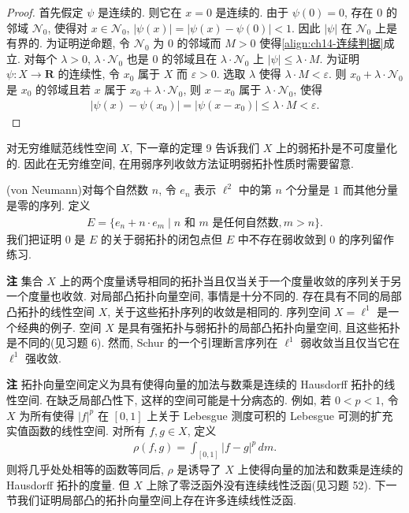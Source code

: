 \documentclass[../../main.tex]{subfiles}
\begin{document}
\begin{proof}
首先假定 $\psi$ 是连续的. 则它在 $x=0$ 是连续的. 由于 $\psi(0)=0$, 存在 $0$ 的邻域 $\mathcal{N}_{0}$, 使得对 $x\in\mathcal{N}_{0}$, $|\psi(x)|=|\psi(x)-\psi(0)|<1$. 因此 $|\psi|$ 在 $\mathcal{N}_{0}$ 上是有界的. 为证明逆命题, 令 $\mathcal{N}_{0}$ 为 $0$ 的邻域而 $M>0$ 使得\eqref{align:ch14-连续判据}成立. 对每个 $\lambda>0$, $\lambda\cdot\mathcal{N}_{0}$ 也是 $0$ 的邻域且在 $\lambda\cdot\mathcal{N}_{0}$ 上 $|\psi|\leqslant\lambda\cdot M$. 为证明 $\psi:X\to\mathbf{R}$ 的连续性, 令 $x_{0}$ 属于 $X$ 而 $\varepsilon>0$. 选取 $\lambda$ 使得 $\lambda\cdot M<\varepsilon$. 则 $x_{0}+\lambda\cdot\mathcal{N}_{0}$ 是 $x_{0}$ 的邻域且若 $x$ 属于 $x_{0}+\lambda\cdot\mathcal{N}_{0}$, 则 $x-x_{0}$ 属于 $\lambda\cdot\mathcal{N}_{0}$, 使得
\begin{align*}
|\psi(x)-\psi(x_{0})|=|\psi(x-x_{0})|\leqslant\lambda\cdot M<\varepsilon.
\end{align*}
\end{proof}

对无穷维赋范线性空间 $X$, 下一章的定理 9 告诉我们 $X$ 上的弱拓扑是不可度量化的. 因此在无穷维空间, 在用弱序列收敛方法证明弱拓扑性质时需要留意.

\begin{example}\label{example:ch14-vonNeumann}
(von Neumann)对每个自然数 $n$, 令 $e_{n}$ 表示 $\ell^{2}$ 中的第 $n$ 个分量是 $1$ 而其他分量是零的序列. 定义
\begin{align*}
E=\{e_{n}+n\cdot e_{m}\mid n\text{ 和 }m\text{ 是任何自然数},m>n\}.
\end{align*}
我们把证明 $0$ 是 $E$ 的关于弱拓扑的闭包点但 $E$ 中不存在弱收敛到 $0$ 的序列留作练习.
\end{example}

\textbf{注} 集合 $X$ 上的两个度量诱导相同的拓扑当且仅当关于一个度量收敛的序列关于另一个度量也收敛. 对局部凸拓扑向量空间, 事情是十分不同的. 存在具有不同的局部凸拓扑的线性空间 $X$, 关于这些拓扑序列的收敛是相同的. 序列空间 $X=\ell^{1}$ 是一个经典的例子. 空间 $X$ 是具有强拓扑与弱拓扑的局部凸拓扑向量空间, 且这些拓扑是不同的(见习题 6). 然而, Schur 的一个引理断言序列在 $\ell^{1}$ 弱收敛当且仅当它在 $\ell^{1}$ 强收敛.

\textbf{注} 拓扑向量空间定义为具有使得向量的加法与数乘是连续的 Hausdorff 拓扑的线性空间. 在缺乏局部凸性下, 这样的空间可能是十分病态的. 例如, 若 $0<p<1$, 令 $X$ 为所有使得 $|f|^{p}$ 在 $[0,1]$ 上关于 Lebesgue 测度可积的 Lebesgue 可测的扩充实值函数的线性空间. 对所有 $f,g\in X$, 定义
\begin{align*}
\rho(f,g)=\int_{[0,1]}|f-g|^{p}\,dm.
\end{align*}
则将几乎处处相等的函数等同后, $\rho$ 是诱导了 $X$ 上使得向量的加法和数乘是连续的 Hausdorff 拓扑的度量. 但 $X$ 上除了零泛函外没有连续线性泛函(见习题 52). 下一节我们证明局部凸的拓扑向量空间上存在许多连续线性泛函.
\end{document}
